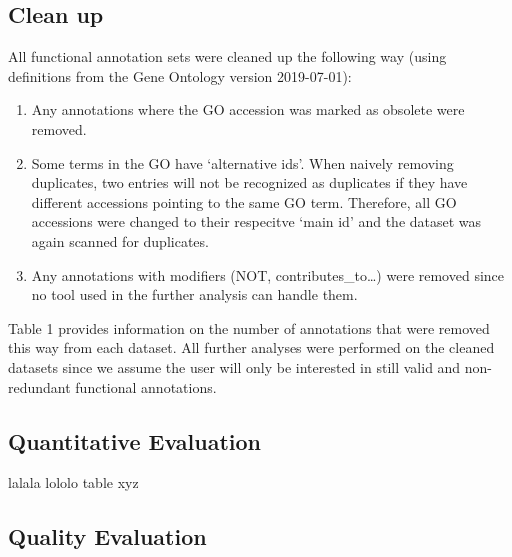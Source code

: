 \documentclass[utf8]{frontiersSCNS}
\providecommand{\tightlist}{%
  \setlength{\itemsep}{0pt}\setlength{\parskip}{0pt}}
\begin{document}
\hypertarget{clean-up}{%
\subsection{Clean up}\label{clean-up}}

All functional annotation sets were cleaned up the following way (using definitions from the Gene Ontology version 2019-07-01):

\begin{enumerate}
\def\labelenumi{\arabic{enumi}.}
\tightlist
\item
  Any annotations where the GO accession was marked as obsolete were removed.
\item
  Some terms in the GO have `alternative ids'. When naively removing duplicates, two entries will not be recognized as duplicates if they have different accessions pointing to the same GO term. Therefore, all GO accessions were changed to their respecitve `main id' and the dataset was again scanned for duplicates.
\item
  Any annotations with modifiers (NOT, contributes\_to\ldots) were removed since no tool used in the further analysis can handle them.
\end{enumerate}

Table 1 provides information on the number of annotations that were removed this way from each dataset.
All further analyses were performed on the cleaned datasets since we assume the user will only be interested in still valid and non-redundant functional annotations.

\hypertarget{quantitative-evaluation}{%
\subsection{Quantitative Evaluation}\label{quantitative-evaluation}}

lalala lololo table xyz

\hypertarget{quality-evaluation}{%
\subsection{Quality Evaluation}\label{quality-evaluation}}
\end{document}
